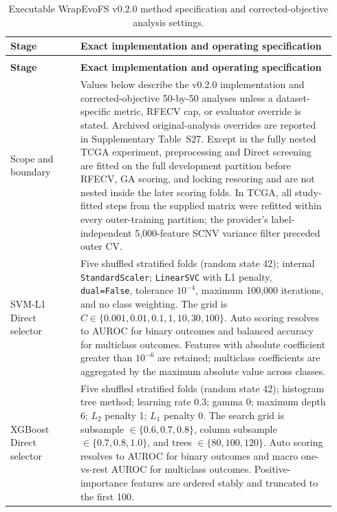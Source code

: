 ﻿{
\footnotesize
\renewcommand{\arraystretch}{1.11}
\setlength{\tabcolsep}{3.5pt}
\begin{longtable}{@{}>{\raggedright\arraybackslash}p{0.205\linewidth}>{\raggedright\arraybackslash}p{0.735\linewidth}@{}}
\caption{Executable WrapEvoFS v0.2.0 method specification and corrected-objective analysis settings.}\label{tab:supp24}\\
\toprule
\bfseries Stage & \bfseries Exact implementation and operating specification \\
\midrule
\endfirsthead
\multicolumn{2}{l}{\footnotesize\itshape \tablename~\thetable\ (continued)}\\
\toprule
\bfseries Stage & \bfseries Exact implementation and operating specification \\
\midrule
\endhead
\bottomrule
\endfoot
Scope and boundary & Values below describe the v0.2.0 implementation and corrected-objective 50-by-50 analyses unless a dataset-specific metric, RFECV cap, or evaluator override is stated. Archived original-analysis overrides are reported in Supplementary Table~S27. Except in the fully nested TCGA experiment, preprocessing and Direct screening are fitted on the full development partition before RFECV, GA scoring, and locking rescoring and are not nested inside the later scoring folds. In TCGA, all study-fitted steps from the supplied matrix were refitted within every outer-training partition; the provider's label-independent 5,000-feature SCNV variance filter preceded outer CV. \\
SVM-L1 Direct selector & Five shuffled stratified folds (random state 42); internal \texttt{StandardScaler}; \texttt{LinearSVC} with L1 penalty, \texttt{dual=False}, tolerance $10^{-4}$, maximum 100,000 iterations, and no class weighting. The grid is $C\in\{0.001,0.01,0.1,1,10,30,100\}$. Auto scoring resolves to AUROC for binary outcomes and balanced accuracy for multiclass outcomes. Features with absolute coefficient greater than $10^{-6}$ are retained; multiclass coefficients are aggregated by the maximum absolute value across classes. \\
XGBoost Direct selector & Five shuffled stratified folds (random state 42); histogram tree method; learning rate 0.3; gamma 0; maximum depth 6; $L_2$ penalty 1; $L_1$ penalty 0. The search grid is subsample $\in\{0.6,0.7,0.8\}$, column subsample $\in\{0.7,0.8,1.0\}$, and trees $\in\{80,100,120\}$. Auto scoring resolves to AUROC for binary outcomes and macro one-vs-rest AUROC for multiclass outcomes. Positive-importance features are ordered stably and truncated to the first 100. \\

\end{longtable}}
